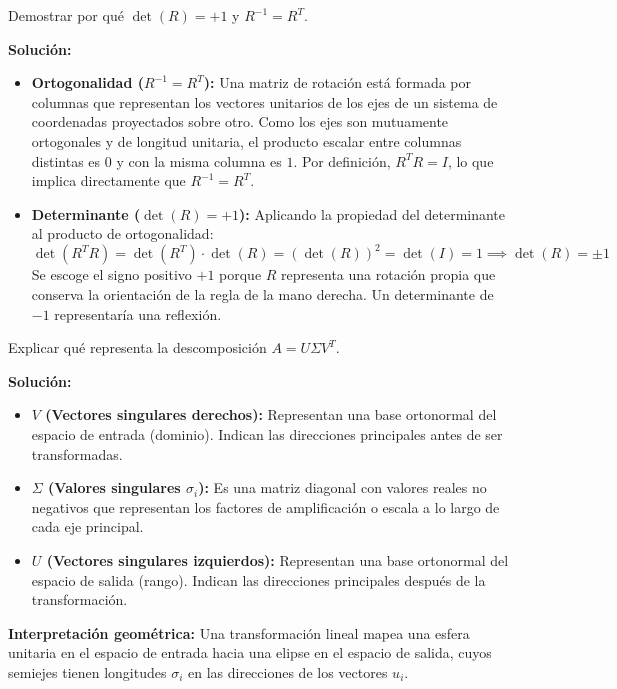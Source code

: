 \documentclass[11pt, a4paper]{article}
\begin{document}
\begin{enunciado}
Demostrar por qué $\det(R) = +1$ y $R^{-1} = R^T$.
\end{enunciado}

\textbf{Solución:}
\begin{itemize}
    \item \textbf{Ortogonalidad ($R^{-1} = R^T$):} Una matriz de rotación está formada por columnas que representan los vectores unitarios de los ejes de un sistema de coordenadas proyectados sobre otro. Como los ejes son mutuamente ortogonales y de longitud unitaria, el producto escalar entre columnas distintas es $0$ y con la misma columna es $1$. Por definición, $R^T R = I$, lo que implica directamente que $R^{-1} = R^T$.
    \item \textbf{Determinante ($\det(R) = +1$):} Aplicando la propiedad del determinante al producto de ortogonalidad:
    $$\det(R^T R) = \det(R^T) \cdot \det(R) = (\det(R))^2 = \det(I) = 1 \implies \det(R) = \pm 1$$
    Se escoge el signo positivo $+1$ porque $R$ representa una rotación propia que conserva la orientación de la regla de la mano derecha. Un determinante de $-1$ representaría una reflexión.
\end{itemize}

\begin{enunciado}
Explicar qué representa la descomposición $A = U \Sigma V^T$.
\end{enunciado}

\textbf{Solución:}
\begin{itemize}
    \item \textbf{$V$ (Vectores singulares derechos):} Representan una base ortonormal del espacio de entrada (dominio). Indican las direcciones principales antes de ser transformadas.
    \item \textbf{$\Sigma$ (Valores singulares $\sigma_i$):} Es una matriz diagonal con valores reales no negativos que representan los factores de amplificación o escala a lo largo de cada eje principal.
    \item \textbf{$U$ (Vectores singulares izquierdos):} Representan una base ortonormal del espacio de salida (rango). Indican las direcciones principales después de la transformación.
\end{itemize}

\textbf{Interpretación geométrica:} Una transformación lineal mapea una esfera unitaria en el espacio de entrada hacia una elipse en el espacio de salida, cuyos semiejes tienen longitudes $\sigma_i$ en las direcciones de los vectores $u_i$.
\end{document}
